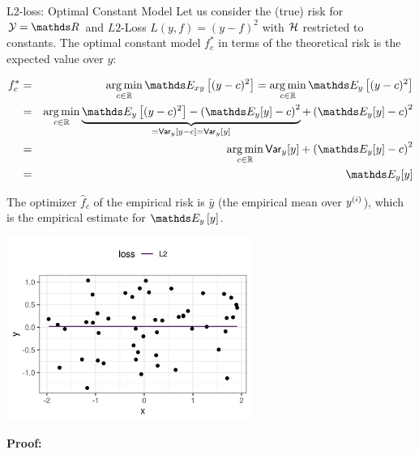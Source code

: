 \documentclass[11pt,compress,t,notes=noshow, xcolor=table]{beamer}
\begin{document}
\begin{vbframe}{L2-loss: Optimal Constant Model}
Let us consider the (true) risk for  $\Yspace = \R$ and $L2$-Loss $L(y,f) = \left(y-f\right)^2$ with $\mathcal{H}$ restricted to constants. The optimal constant model $f_{c}^{\ast}$ in terms of the theoretical risk is the expected value over $y$: 

\medskip

  \begin{eqnarray*}
    f_{c}^{\ast} &=& \argmin_{c \in \mathbb{R}} \E_{xy} \left[(y-c)^2\right] = \argmin_{c \in \mathbb{R}} \E_{y} \left[(y-c)^2\right] %
    \\
    &=& \argmin_{c \in \mathbb{R}} \underbrace{\E_{y}\left[(y - c)^2\right] - \left(\E_{y}[y] - c\right)^2}_{= \var_{y}[y - c] = \var_{y}[y]} + \left(\E_{y}[y] - c\right)^2 \\
    &=& \argmin_{c \in \mathbb{R}} \var_{y}[y] + \left(\E_{y}[y] - c\right)^2  \\
    &=& \E_{y}[y]
  \end{eqnarray*} 

\framebreak 

The optimizer $\hat{f}_{c}$ of the empirical risk is $\bar y$ (the empirical mean over $y^{(i)}$), which is the empirical estimate for $\E_y \left[y\right]$. 

\begin{center}
\includegraphics[width = 0.6\textwidth ]{figure/L2-loss.png} \\
\end{center}

\framebreak

\textbf{Proof: }

\vspace{0.2cm}


\end{vbframe}
\end{document}
